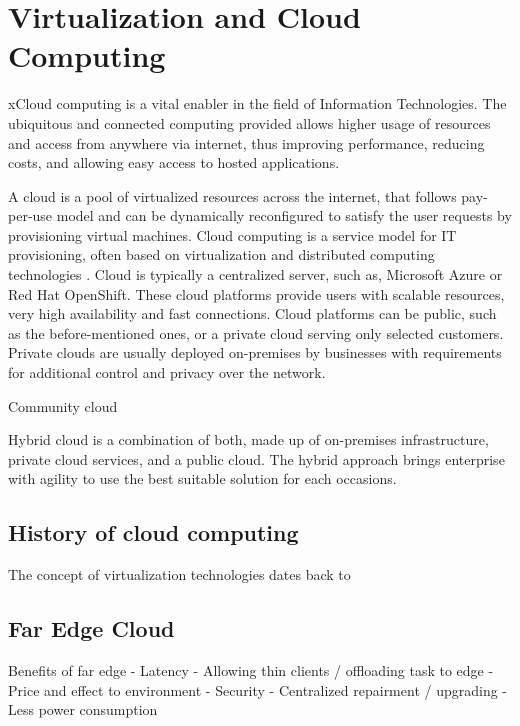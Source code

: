 \chapter{Virtualization and Cloud Computing}
\label{chapter:cloudcomputing}

xCloud computing is a vital enabler in the field of Information Technologies. The ubiquitous and connected computing provided allows higher usage of resources and access from anywhere via internet, thus improving performance, reducing costs, and allowing easy access to hosted applications.

A cloud is a pool of virtualized resources across the internet, that follows pay-per-use model and can be dynamically reconfigured to satisfy the user requests by provisioning virtual machines. Cloud computing is a service model for IT provisioning, often based on virtualization and distributed computing technologies \cite{Lombardi2011}. Cloud is typically a centralized server, such as, Microsoft Azure or Red Hat OpenShift. These cloud platforms provide users with scalable resources, very high availability and fast connections. Cloud platforms can be public, such as the before-mentioned ones, or a private cloud serving only selected customers. Private clouds are usually deployed on-premises by businesses with requirements for additional control and privacy over the network. \cite{MicrosoftAzure}

Community cloud

Hybrid cloud is a combination of both, made up of on-premises infrastructure, private cloud services, and a public cloud. The hybrid approach brings enterprise with agility to use the best suitable solution for each occasions. \cite{NetApp}


\section{History of cloud computing}

The concept of virtualization technologies dates back to 

\section{Far Edge Cloud}

Benefits of far edge
    - Latency
    - Allowing thin clients / offloading task to edge
    - Price and effect to environment
    - Security
    - Centralized repairment / upgrading
    - Less power consumption

